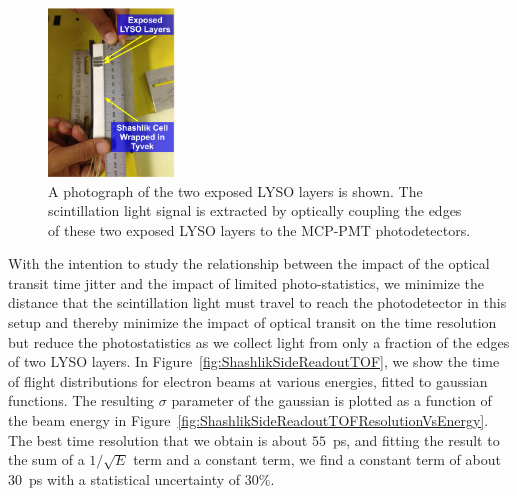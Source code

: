 \documentclass[12pt]{article}
\begin{document}
\begin{figure}[H] \centering
\includegraphics[width=0.30\textwidth]{figs/ShashlikSideReadoutPhotoA} 
\caption{ A photograph of the two exposed LYSO layers is shown.
The scintillation light signal is extracted by optically coupling
the edges of these two exposed LYSO layers to the MCP-PMT
photodetectors. } 
\label{fig:ShashlikSideReadoutExposedLayersPhoto}
\end{figure}

With the intention to study the relationship between the impact of the 
optical transit time jitter and the impact of limited photo-statistics,
we minimize the distance that the scintillation light
must travel to reach the photodetector in this setup and thereby minimize the
impact of optical transit on the time resolution but reduce the photostatistics 
as we collect light from only a fraction of the edges of two LYSO layers. 
In Figure~\ref{fig:ShashlikSideReadoutTOF}, we show the 
time of flight distributions for electron beams at various energies, 
fitted to gaussian functions. The resulting
$\sigma$ parameter of the gaussian is plotted as a function of the
beam energy in Figure~\ref{fig:ShashlikSideReadoutTOFResolutionVsEnergy}.
The best time  resolution that we obtain is about $55$~ps, and
fitting the result to the sum of a $1/\sqrt{E}$ term and a constant term,
we find a constant term of about $30$~ps with a statistical uncertainty of $30\%$. 
\end{document}
